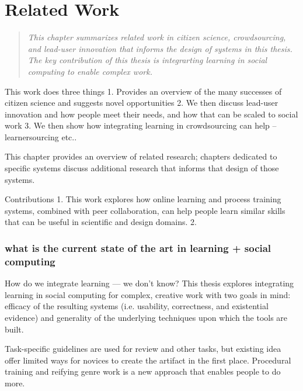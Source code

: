 
\chapter{Related Work}

\begin{quote}
\emph{This chapter summarizes related work in citizen science, crowdsourcing, and  lead-user innovation that informs the design of systems in this thesis. The key contribution of this thesis is integrarting learning in social computing to enable complex work. }

\end{quote}
\vspace{0.25in}


This work does three things
1. Provides an overview of the many successes of citizen science and suggests novel opportunities
2. We then discuss lead-user innovation and how people meet their needs, and how that can be scaled to social work
3. We then show how integrating learning in crowdsourcing can help -- learnersourcing etc.. 

This chapter provides an overview of related research; chapters dedicated to specific systems discuss additional research that informs that design of those systems.

Contributions
1. This work explores how
online learning and process training systems, combined with
peer collaboration, can help people learn similar skills that
can be useful in scientific and design domains.
2. 


\subsection{what is the current state of the art in learning + social computing}
How do we integrate learning — we don’t know? This thesis explores integrating learning in social computing for complex, creative work with two goals in mind: efficacy of the resulting systems (i.e. usability, correctness, and existential evidence) and generality of the underlying techniques upon which the tools are built.

Task-specific guidelines are used for review and other tasks, but existing idea offer limited ways for novices to create the artifact in the first place. Procedural training and reifying genre work is a new approach that enables people to do more. 

